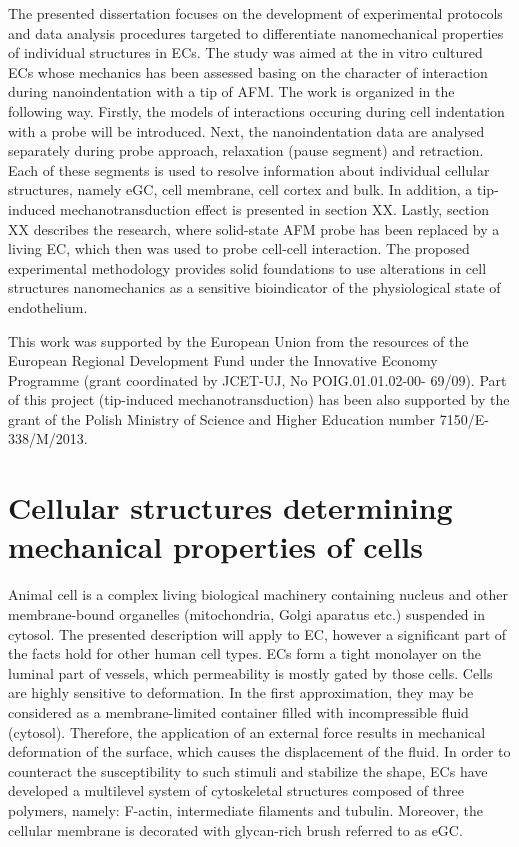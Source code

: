 The presented dissertation focuses on the development of experimental protocols and data analysis procedures targeted to differentiate nanomechanical properties of individual structures in \glspl{EC}. The study was aimed at the in vitro cultured \glspl{EC} whose mechanics has been assessed basing on the character of interaction during nanoindentation with a tip of \gls{AFM}. The work is organized in the following way. Firstly, the models of interactions occuring during cell indentation with a probe will be introduced. Next, the nanoindentation data are analysed separately during probe approach, relaxation (pause segment) and retraction. Each of these segments is used to resolve information about individual cellular structures, namely \gls{eGC}, cell membrane, cell cortex and bulk. In addition, a tip-induced mechanotransduction effect is presented in section XX. Lastly, section XX describes the research, where solid-state \gls{AFM} probe has been replaced by a living \gls{EC}, which then was used to probe cell-cell interaction. The proposed experimental methodology provides solid foundations to use alterations in cell structures nanomechanics as a sensitive bioindicator of the physiological state of endothelium. 


This work was supported by the European Union from the resources of the European Regional Development Fund under the Innovative Economy Programme (grant coordinated by JCET-UJ, No POIG.01.01.02-00- 69/09). Part of this project (tip-induced mechanotransduction) has been also supported by the grant of the Polish Ministry of Science and Higher Education number 7150/E-338/M/2013.


\section{Cellular structures determining mechanical properties of cells}\label{sec:cellular_structures}
Animal cell is a complex living biological machinery containing nucleus and other membrane-bound organelles (mitochondria, Golgi aparatus etc.) suspended in cytosol. The presented description will apply to \gls{EC}, however a significant part of the facts hold for other human cell types. \Glspl{EC} form a tight monolayer on the luminal part of vessels, which permeability is mostly gated by those cells. Cells are highly sensitive to deformation. In the first approximation, they may be considered as a membrane-limited container filled with incompressible fluid (cytosol). Therefore, the application of an external force results in mechanical deformation of the surface, which causes the displacement of the fluid. In order to counteract the susceptibility to such stimuli and stabilize the shape, \glspl{EC} have developed a multilevel system of cytoskeletal structures composed of three polymers, namely: F-actin, intermediate filaments and tubulin. Moreover, the cellular membrane is decorated with glycan-rich brush referred to as \gls{eGC}.


